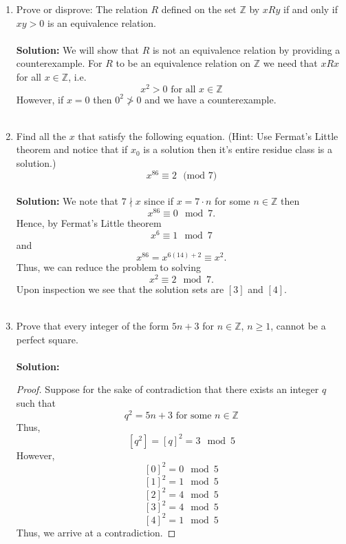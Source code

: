 \documentclass[12pt,letterpaper]{article}
\theoremstyle{plain}
\theoremstyle{definition}
\begin{document}
\begin{enumerate}[1.]
\begin{proof}
\begin{enumerate}
\item\label{c} If $x R y$ and $y R z$ then $x R z$.
\end{enumerate}
To show (a) notice that if $x\in A_i$ for some $i$ that $x\in A_i$, i.e. $x R x$. To show (b) suppose that $x R y$, then $x\in A_i$ and $y\in A_i$ for the same $i$. Hence $y R x$. To show (c), suppose that $ x R y$ and $y R z$. Then $x\in A_i$ and $y\in A_i$ for some $i$ and $y\in A_j$ and $z\in A_j$ for some $j$. We must have that $A_i=A_j$ since $y\in A_i$, $y\in A_j$ and $A_i\cap A_j=\emptyset$ if $i\neq j$. Hence $x$ and $z$ lie in the same $A_i$ and thus $x R z$. 
\end{proof}
\ \\
\item Prove or disprove: The relation $R$ defined on the set $\mathbb{Z}$ by $x R y$ if and only if $xy>0$ is an equivalence relation. \\
\ \\
{\bf Solution: }
We will show that $R$ is not an equivalence relation by providing a counterexample. For $R$ to be an equivalence relation on $\mathbb{Z}$ we need that $x R x$ for all $x\in \mathbb{Z}$, i.e. 
\[x^2>0 \text{ for all }x\in \mathbb{Z}\]
However, if $x=0$ then $0^2\not > 0$ and we have a counterexample.\\
\ \\
\item Find all the $x$ that satisfy the following equation. (Hint: Use Fermat's Little theorem and notice that if $x_0$ is a solution then it's entire residue class is a solution.) 
\[x^{86} \equiv 2\ \ \  \text{(mod 7)}\]
\ \\
{\bf Solution: }
We note that $7\nmid x$ since if $x=7\cdot n$ for some $n\in \mathbb{Z}$ then 
\[x^{86}\equiv 0 \mod 7.\]
Hence, by Fermat's Little theorem 
\[x^6\equiv 1 \mod 7\]
and 
\[x^{86}=x^{6(14)+2}\equiv x^2.\]
Thus, we can reduce the problem to solving 
\[x^2\equiv 2 \mod 7.\]
Upon inspection we see that the solution sets are $[3]$ and $[4]$. \\
\ \\
\item Prove that every integer of the form $5n+3$ for $n\in \mathbb{Z}$, $n\geq 1$, cannot be a perfect square.  \\
\ \\
{\bf Solution: }
\begin{proof}
Suppose for the sake of contradiction that there exists an integer $q$ such that 
\[q^2=5n+3 \text{ for some }n\in \mathbb{Z}\]
Thus, 
\[[q^2]=[q]^2=3 \mod 5\]
However, 
\[[0]^2=0 \mod 5\]
\[[1]^2=1 \mod 5\]
\[[2]^2=4 \mod 5\]
\[[3]^2=4 \mod 5\]
\[[4]^2=1 \mod 5\]
Thus, we arrive at a contradiction. 
\end{proof}
\end{enumerate}
\end{document}
